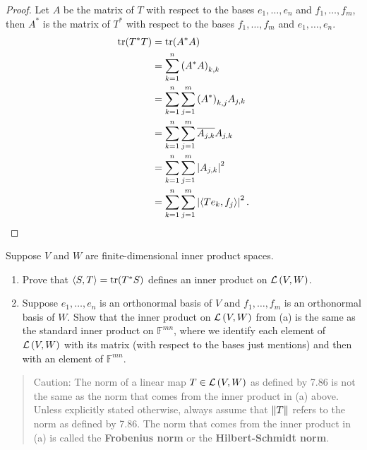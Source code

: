 \begin{proof}
    Let $A$ be the matrix of $T$ with respect to the bases $e_{1}, \ldots, e_{n}$ and $f_{1}, \ldots, f_{m}$, then $A^{*}$ is the matrix of $T^{*}$ with respect to the bases $f_{1}, \ldots, f_{m}$ and $e_{1}, \ldots, e_{n}$.
    \begin{align*}
        \operatorname{tr}(T^{*}T) & = \operatorname{tr}(A^{*}A)                                        \\
                                  & = \sum^{n}_{k=1}{(A^{*}A)}_{k,k}                                   \\
                                  & = \sum^{n}_{k=1}\sum^{m}_{j=1}{(A^{*})}_{k,j}A_{j,k}               \\
                                  & = \sum^{n}_{k=1}\sum^{m}_{j=1}\overline{A_{j,k}}A_{j,k}                \\
                                  & = \sum^{n}_{k=1}\sum^{m}_{j=1}\left\vert{A_{j,k}}\right\vert^{2}                    \\
                                  & = \sum^{n}_{k=1}\sum^{m}_{j=1}\left\vert{\left\langle{Te_{k}, f_{j}}\right\rangle}\right\vert^{2}.
    \end{align*}
\end{proof}
\newpage

\begin{exercise}\label{chapter8:sectionD:exercise12}
    Suppose $V$ and $W$ are finite-dimensional inner product spaces.
    \begin{enumerate}[label={(\alph*)}]
        \item Prove that $\left\langle{S, T}\right\rangle = \operatorname{tr}(T^{*}S)$ defines an inner product on $\mathcal{L}\left({V, W}\right)$.
        \item Suppose $e_{1}, \ldots, e_{n}$ is an orthonormal basis of $V$ and $f_{1}, \ldots, f_{m}$ is an orthonormal basis of $W$. Show that the inner product on $\mathcal{L}\left({V, W}\right)$ from (a) is the same as the standard inner product on $\mathbb{F}^{mn}$, where we identify each element of $\mathcal{L}\left({V, W}\right)$ with its matrix (with respect to the bases just mentions) and then with an element of $\mathbb{F}^{mn}$.
    \end{enumerate}
\end{exercise}

\begin{quote}
    Caution: The norm of a linear map $T\in\mathcal{L}\left({V, W}\right)$ as defined by 7.86 is not the same as the norm that comes from the inner product in (a) above. Unless explicitly stated otherwise, always assume that $\left\Vert{T}\right\Vert$ refers to the norm as defined by 7.86. The norm that comes from the inner product in (a) is called the \textbf{Frobenius norm} or the \textbf{Hilbert-Schmidt norm}.
\end{quote}

